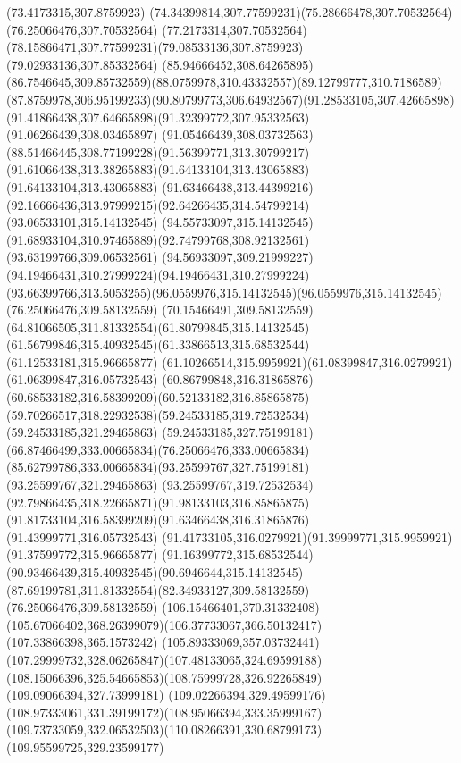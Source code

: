 {{\lineto(73.4173315,307.8759923)
\curveto(74.34399814,307.77599231)(75.28666478,307.70532564)(76.25066476,307.70532564)
\curveto(77.2173314,307.70532564)(78.15866471,307.77599231)(79.08533136,307.8759923)
\lineto(79.02933136,307.85332564)
\lineto(85.94666452,308.64265895)
\curveto(86.7546645,309.85732559)(88.0759978,310.43332557)(89.12799777,310.7186589)
\curveto(87.8759978,306.95199233)(90.80799773,306.64932567)(91.28533105,307.42665898)
\curveto(91.41866438,307.64665898)(91.32399772,307.95332563)(91.06266439,308.03465897)
\curveto(91.05466439,308.03732563)(88.51466445,308.77199228)(91.56399771,313.30799217)
\curveto(91.61066438,313.38265883)(91.64133104,313.43065883)(91.64133104,313.43065883)
\lineto(91.63466438,313.44399216)
\curveto(92.16666436,313.97999215)(92.64266435,314.54799214)(93.06533101,315.14132545)
\lineto(94.55733097,315.14132545)
\curveto(91.68933104,310.97465889)(92.74799768,308.92132561)(93.63199766,309.06532561)
\curveto(94.56933097,309.21999227)(94.19466431,310.27999224)(94.19466431,310.27999224)
\curveto(93.66399766,313.5053255)(96.0559976,315.14132545)(96.0559976,315.14132545)
\moveto(76.25066476,309.58132559)
\curveto(70.15466491,309.58132559)(64.81066505,311.81332554)(61.80799845,315.14132545)
\curveto(61.56799846,315.40932545)(61.33866513,315.68532544)(61.12533181,315.96665877)
\curveto(61.10266514,315.9959921)(61.08399847,316.0279921)(61.06399847,316.05732543)
\curveto(60.86799848,316.31865876)(60.68533182,316.58399209)(60.52133182,316.85865875)
\curveto(59.70266517,318.22932538)(59.24533185,319.72532534)(59.24533185,321.29465863)
\curveto(59.24533185,327.75199181)(66.87466499,333.00665834)(76.25066476,333.00665834)
\curveto(85.62799786,333.00665834)(93.25599767,327.75199181)(93.25599767,321.29465863)
\curveto(93.25599767,319.72532534)(92.79866435,318.22665871)(91.98133103,316.85865875)
\curveto(91.81733104,316.58399209)(91.63466438,316.31865876)(91.43999771,316.05732543)
\curveto(91.41733105,316.0279921)(91.39999771,315.9959921)(91.37599772,315.96665877)
\curveto(91.16399772,315.68532544)(90.93466439,315.40932545)(90.6946644,315.14132545)
\curveto(87.69199781,311.81332554)(82.34933127,309.58132559)(76.25066476,309.58132559)
\moveto(106.15466401,370.31332408)
\curveto(105.67066402,368.26399079)(106.37733067,366.50132417)(107.33866398,365.1573242)
\curveto(105.89333069,357.03732441)(107.29999732,328.06265847)(107.48133065,324.69599188)
\curveto(108.15066396,325.54665853)(108.75999728,326.92265849)(109.09066394,327.73999181)
\curveto(109.02266394,329.49599176)(108.97333061,331.39199172)(108.95066394,333.35999167)
\curveto(109.73733059,332.06532503)(110.08266391,330.68799173)(109.95599725,329.23599177)
}}
